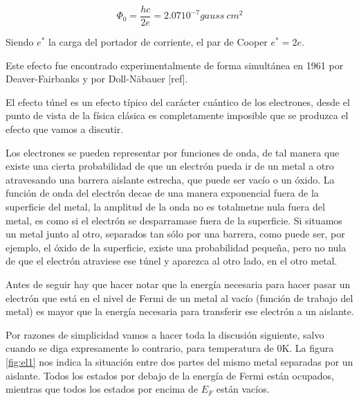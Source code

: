 \begin{equation}
    \Phi_0 = \frac{h c}{2 e} = 2.07 10^{-7} gauss\ cm^2
\end{equation}

Siendo $e^*$ la carga del portador de corriente, el par de Cooper $e^* = 2e$.

Este efecto fue encontrado experimentalmente de forma simultánea en 1961 por Deaver-Fairbanks \cite{deaver} y por Doll-Näbauer [ref].

El efecto túnel es un efecto típico del carácter cuántico de los electrones, desde el punto de vista de la física clásica es completamente imposible que se produzca el efecto que vamos a discutir.

Los electrones se pueden representar por funciones de onda, de tal manera que existe una cierta probabilidad de que un electrón pueda ir de un metal a otro atravesando una barrera aislante estrecha, que puede ser vacío o un óxido. La función de onda del electrón decae de una manera exponencial fuera de la superficie del metal, la amplitud de la onda no es totalmetne nula fuera del metal, es como si el electrón se desparramase fuera de la superficie. Si situamos un metal junto al otro, separados tan sólo por una barrera, como puede ser, por ejemplo, el óxido de la superficie, existe una probabilidad pequeña, pero no nula de que el electrón atraviese ese túnel y aparezca al otro lado, en el otro metal.

Antes de seguir hay que hacer notar que la energía necesaria para hacer pasar un electrón que está en el nivel de Fermi de un metal al vacío (función de trabajo del metal) es mayor que la energía necesaria para transferir ese electrón a un aislante.

Por razones de simplicidad vamos a hacer toda la discusión siguiente, salvo cuando se diga expresamente lo contrario, para temperatura de 0K. La figura \ref{fig:el1} nos indica la situación entre dos partes del mismo metal separadas por un aislante. Todos los estados por debajo de la energía de Fermi están ocupados, mientras que todos los estados por encima de $E_F$ están vacíos.

